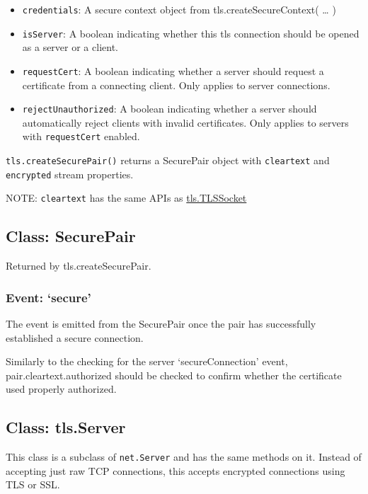 \begin{itemize}
\item
  \texttt{credentials}: A secure context object from
  tls.createSecureContext( \ldots{} )
\item
  \texttt{isServer}: A boolean indicating whether this tls connection
  should be opened as a server or a client.
\item
  \texttt{requestCert}: A boolean indicating whether a server should
  request a certificate from a connecting client. Only applies to server
  connections.
\item
  \texttt{rejectUnauthorized}: A boolean indicating whether a server
  should automatically reject clients with invalid certificates. Only
  applies to servers with \texttt{requestCert} enabled.
\end{itemize}

\texttt{tls.createSecurePair()} returns a SecurePair object with
\texttt{cleartext} and \texttt{encrypted} stream properties.

NOTE: \texttt{cleartext} has the same APIs as
\hyperref[tlsux5fclassux5ftlsux5ftlssocket]{tls.TLSSocket}

\subsection{Class: SecurePair}\label{class-securepair}

Returned by tls.createSecurePair.

\subsubsection{Event: `secure'}\label{event-secure}

The event is emitted from the SecurePair once the pair has successfully
established a secure connection.

Similarly to the checking for the server `secureConnection' event,
pair.cleartext.authorized should be checked to confirm whether the
certificate used properly authorized.

\subsection{Class: tls.Server}\label{class-tls.server}

This class is a subclass of \texttt{net.Server} and has the same methods
on it. Instead of accepting just raw TCP connections, this accepts
encrypted connections using TLS or SSL.

